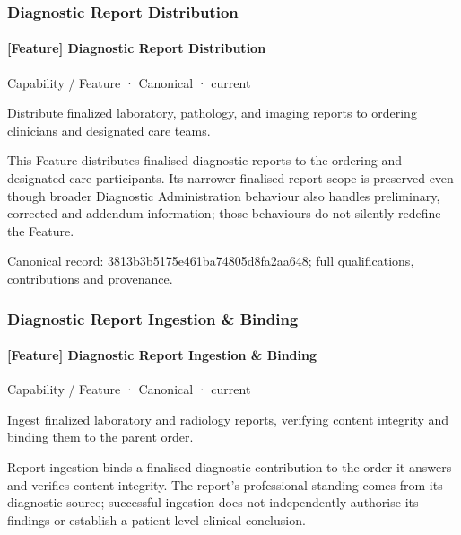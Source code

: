 \subsubsection{Diagnostic Report Distribution}

\paragraph{[Feature] Diagnostic Report Distribution}

\label{element:3813b3b5175e461ba74805d8fa2aa648}
{\small Capability / Feature · Canonical · current}\par

Distribute finalized laboratory, pathology, and imaging reports to ordering clinicians and designated care teams.



This Feature distributes finalised diagnostic reports to the ordering and designated care participants. Its narrower finalised-report scope is preserved even though broader Diagnostic Administration behaviour also handles preliminary, corrected and addendum information; those behaviours do not silently redefine the Feature.


{\footnotesize \href{../../../../continuum/strategy/capability/feature/3813b3b5175e461ba74805d8fa2aa648.md}{Canonical record: 3813b3b5175e461ba74805d8fa2aa648}; full qualifications, contributions and provenance.}\par
\subsubsection{Diagnostic Report Ingestion \& Binding}

\paragraph{[Feature] Diagnostic Report Ingestion \& Binding}

\label{element:a00823445a8a44c1a00f3ec93a7e0e6f}
{\small Capability / Feature · Canonical · current}\par

Ingest finalized laboratory and radiology reports, verifying content integrity and binding them to the parent order.



Report ingestion binds a finalised diagnostic contribution to the order it answers and verifies content integrity. The report's professional standing comes from its diagnostic source; successful ingestion does not independently authorise its findings or establish a patient-level clinical conclusion.


